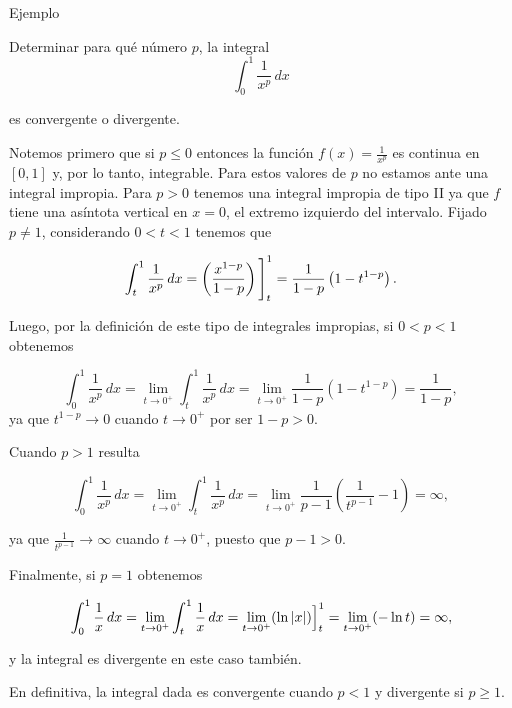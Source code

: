 \documentclass[
  letterpaper,
]{book}
\theoremstyle{plain}
\theoremstyle{remark}
\begin{document}
Ejemplo

Determinar para qué número \(p\), la integral \[
\int_{0}^{1} \frac{1}{x^{p}}\,dx
\]

es convergente o divergente.

\begin{tcolorbox}[enhanced jigsaw, opacityback=0, left=2mm, opacitybacktitle=0.6, toprule=.15mm, bottomrule=.15mm, colbacktitle=quarto-callout-tip-color!10!white, titlerule=0mm, bottomtitle=1mm, title=\textcolor{quarto-callout-tip-color}{\faLightbulb}\hspace{0.5em}{Solución}, toptitle=1mm, colframe=quarto-callout-tip-color-frame, colback=white, breakable, rightrule=.15mm, arc=.35mm, leftrule=.75mm, coltitle=black]

Notemos primero que si \(p\leq 0\) entonces la función
\(\displaystyle f(x)=\frac{1}{x^p}\) es continua en \([0,1]\) y, por lo
tanto, integrable. Para estos valores de \(p\) no estamos ante una
integral impropia. Para \(p>0\) tenemos una integral impropia de tipo II
ya que \(f\) tiene una asíntota vertical en \(x=0\), el extremo
izquierdo del intervalo. Fijado \(p\neq 1\), considerando \(0<t<1\)
tenemos que

\[
\int_t^1 \frac{1}{x^p}\,dx=\left(\frac{x^{1-p}}{1-p}\right)\Bigg{]}_t^1=\frac{1}{1-p}\left(1-t^{1-p}\right).
\]

Luego, por la definición de este tipo de integrales impropias, si
\(0<p<1\) obtenemos

\[
\int_0^1 \frac{1}{x^p}\,dx=\lim_{t\to 0^+} \int_t^1 \frac{1}{x^p}\,dx=\lim_{t\to 0^+} \frac{1}{1-p}\left(1-t^{1-p}\right)=\frac{1}{1-p},
\] ya que \(t^{1-p}\to 0\) cuando \(t\to 0^+\) por ser \(1-p>0\).

Cuando \(p>1\) resulta

\[
\int_0^1 \frac{1}{x^p}\,dx=\lim_{t\to 0^+} \int_t^1 \frac{1}{x^p}\,dx=\lim_{t\to 0^+} \frac{1}{p-1}\left(\frac{1}{t^{p-1}}-1\right)=\infty,
\]

ya que \(\displaystyle \frac{1}{t^{p-1}}\to \infty\) cuando
\(t\to 0^+\), puesto que \(p-1>0\).

Finalmente, si \(p=1\) obtenemos

\[
\int_0^1 \frac{1}{x}\,dx=\lim_{t\to 0^+} \int_t^1 \frac{1}{x}\,dx=\lim_{t\to 0^+} (\ln |x|)\Big{]}_t^1=\lim_{t\to 0^+} (-\ln t)=\infty,
\]

y la integral es divergente en este caso también.

En definitiva, la integral dada es convergente cuando \(p<1\) y
divergente si \(p\geq 1\).

\end{tcolorbox}
\end{document}
